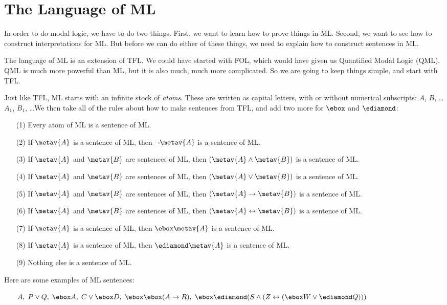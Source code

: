 \section{The Language of ML}
\label{TFLtoML}

In order to do modal logic, we have to do two things. First, we want to learn how to prove things in ML. Second, we want to see how to construct interpretations for ML. But before we can do either of these things, we need to explain how to construct sentences in ML.

The language of ML is an extension of TFL. We could have started with FOL, which would have given us Quantified Modal Logic (QML). QML is much more powerful than ML, but it is also much, much more complicated. So we are going to keep things simple, and start with TFL.

Just like TFL, ML starts with an infinite stock of \emph{atoms}. These are written as capital letters, with or without numerical subscripts: $A$, $B$, \dots  $A_1$, $B_1$, \dots  We then take all of the rules about how to make sentences from TFL, and add two more for $\ebox$ and $\ediamond$:
\begin{itemize}
	\item[(1)]Every atom of ML is a sentence of ML.
	\item[(2)]If $\metav{A}$ is a sentence of ML, then $\enot\metav{A}$ is a sentence of ML.
	\item[(3)]If $\metav{A}$ and $\metav{B}$ are sentences of ML, then $(\metav{A}\eand\metav{B})$ is a sentence of ML.
	\item[(4)]If $\metav{A}$ and $\metav{B}$ are sentences of ML, then $(\metav{A}\eor\metav{B})$ is a sentence of ML.
	\item[(5)]If $\metav{A}$ and $\metav{B}$ are sentences of ML, then $(\metav{A}\eif\metav{B})$ is a sentence of ML.
	\item[(6)]If $\metav{A}$ and $\metav{B}$ are sentences of ML, then $(\metav{A}\eiff\metav{B})$ is a sentence of ML.
	\item[(7)]If $\metav{A}$ is a sentence of ML, then $\ebox\metav{A}$ is a sentence of ML.
	\item[(8)]If $\metav{A}$ is a sentence of ML, then $\ediamond\metav{A}$ is a sentence of ML.
	\item[(9)]Nothing else is a sentence of ML.
\end{itemize}
Here are some examples of ML sentences:
\begin{itemize}
	\item[]$A,\;P\eor Q,\;\ebox A,\;C\eor \ebox D,\;\ebox\ebox (A\eif R),\;\ebox\ediamond (S\eand (Z\eiff (\ebox W \eor \ediamond Q)))$
\end{itemize}

